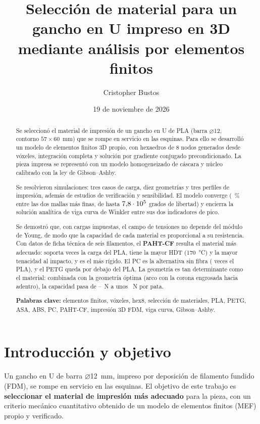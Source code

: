 \documentclass[11pt,a4paper]{article}
\title{Selección de material para un gancho en U impreso en 3D\\mediante análisis por elementos finitos}
\author{Cristopher Bustos}
\date{19 de noviembre de 2026}
\begin{document}
\maketitle

\begin{abstract}
\noindent
Se seleccionó el material de impresión de un gancho en U de PLA (barra $\varnothing$12, contorno $57\times60$~mm) que se rompe en servicio en las esquinas. Para ello se desarrolló un modelo de elementos finitos 3D propio, con hexaedros de 8 nodos generados desde vóxeles, integración completa y solución por gradiente conjugado precondicionado. La pieza impresa se representó con un modelo homogeneizado de cáscara y núcleo calibrado con la ley de Gibson--Ashby.

Se resolvieron \NSims{} simulaciones: tres casos de carga, diez geometrías y tres perfiles de impresión, además de estudios de verificación y sensibilidad. El modelo converge (\ConvLast~\% entre las dos mallas más finas, de hasta $7{,}8\cdot10^5$ grados de libertad) y encierra la solución analítica de viga curva de Winkler entre sus dos indicadores de pico.

Se demostró que, con cargas impuestas, el campo de tensiones no depende del módulo de Young, de modo que la capacidad de cada material es proporcional a su resistencia. Con datos de ficha técnica de seis filamentos, el \textbf{PAHT-CF} resulta el material más adecuado: soporta \PAHTvsPLA{} veces la carga del PLA, tiene la mayor HDT (170~°C) y la mayor tenacidad al impacto, y es el más rígido. El PC es la alternativa sin fibra (\PCvsPLA{} veces el PLA), y el PETG queda por debajo del PLA. La geometría es tan determinante como el material: combinada con la geometría óptima (arco con la corona engrosada hacia adentro), la capacidad pasa de \FuFivePLAlo--\FuFivePLAhi{}~N a unos \FuTenPAHT{}~N por pata.

\smallskip\noindent\textbf{Palabras clave:} elementos finitos, vóxeles, hex8, selección de materiales, PLA, PETG, ASA, ABS, PC, PAHT-CF, impresión 3D FDM, viga curva, Gibson--Ashby.
\end{abstract}

\section{Introducción y objetivo}
Un gancho en U de barra $\varnothing$12~mm, impreso por deposición de filamento fundido (FDM), se rompe en servicio en las esquinas. El objetivo de este trabajo es \textbf{seleccionar el material de impresión más adecuado} para la pieza, con un criterio mecánico cuantitativo obtenido de un modelo de elementos finitos (MEF) propio y verificado.
\end{document}

